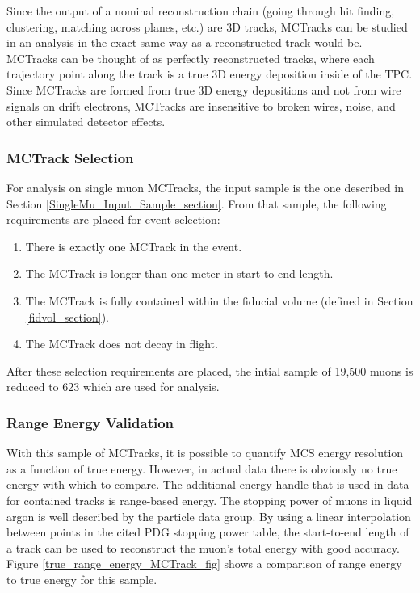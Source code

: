 Since the output of a nominal reconstruction chain (going through hit finding, clustering, matching across planes, etc.) are 3D tracks, {\sc MCTracks} can be studied in an analysis in the exact same way as a reconstructed track would be. {\sc MCTracks} can be thought of as perfectly reconstructed tracks, where each trajectory point along the track is a true 3D energy deposition inside of the {\ub} TPC.\\

Since {\sc MCTracks} are formed from true 3D energy depositions and not from wire signals on drift electrons, {\sc MCTracks} are insensitive to broken wires, noise, and other simulated detector effects.

\subsubsection{MCTrack Selection}\label{MCTrack_Selection_section}
For analysis on single muon {\sc MCTracks}, the input sample is the one described in Section \ref{SingleMu_Input_Sample_section}. From that sample, the following requirements are placed for event selection:
\begin{enumerate}
	\item There is exactly one {\sc MCTrack} in the event.
	\item The {\sc MCTrack} is longer than one meter in start-to-end length.
	\item The {\sc MCTrack} is fully contained within the fiducial volume (defined in Section \ref{fidvol_section}).
	\item The {\sc MCTrack} does not decay in flight.
\end{enumerate}
After these selection requirements are placed, the intial sample of 19,500 muons is reduced to 623 which are used for analysis.

\subsubsection{Range Energy Validation}\label{Range_Energy_Validation_section}
With this sample of {\sc MCTracks}, it is possible to quantify MCS energy resolution as a function of true energy. However, in actual {\ub} data there is obviously no true energy with which to compare. The additional energy handle that is used in data for contained tracks is range-based energy. The stopping power of muons in liquid argon is well described by the particle data group\cite{PDG_spline_table}. By using a linear interpolation between points in the cited PDG stopping power table, the start-to-end length of a track can be used to reconstruct the muon's total energy with good accuracy. Figure \ref{true_range_energy_MCTrack_fig} shows a comparison of range energy to true energy for this sample. \\

